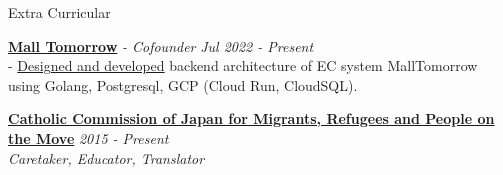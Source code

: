 \documentclass{resume} %
\begin{document}
\begin{rSection}{Extra Curricular}



{\bf \href{https://www.linkedin.com/company/mall-tomorrow/}{Mall Tomorrow}}{\textit{ - Cofounder}} \hfill {\em Jul 2022 - Present} 
\\- \uline{Designed and developed} backend architecture of EC system MallTomorrow using Golang, Postgresql, GCP (Cloud Run, CloudSQL). 

{\bf\href{https://www.cbcj.catholic.jp/english/japan/comt/migrantsrefugees_e/}{Catholic Commission of Japan for Migrants, Refugees and People on the
Move}} \hfill {\em 2015 - Present} \\
{\textit{Caretaker, Educator, Translator}}



\end{rSection}



\end{document}
